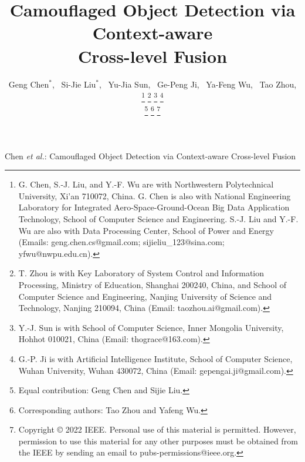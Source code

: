 \documentclass[lettersize,journal]{IEEEtran}
\begin{document}
\title{Camouflaged Object Detection via Context-aware\\ Cross-level Fusion}

\author{Geng Chen$^{*}$,~
	Si-Jie Liu$^{*}$,~
	Yu-Jia Sun,~
	Ge-Peng Ji,~
	Ya-Feng Wu,~
	Tao Zhou, 

\thanks{G. Chen, S.-J. Liu, and Y.-F. Wu are with Northwestern Polytechnical University, Xi'an 710072, China. G. Chen is also with National Engineering Laboratory for Integrated Aero-Space-Ground-Ocean Big Data Application Technology, School of Computer Science and Engineering. S.-J. Liu and Y.-F. Wu are also with Data Processing Center, School of Power and Energy (Emails: geng.chen.cs@gmail.com; sijieliu\_123@sina.com; yfwu@nwpu.edu.cn).}
\thanks{T. Zhou is with Key Laboratory of System Control and Information Processing, Ministry of Education, Shanghai 200240, China, and School of Computer Science and Engineering, Nanjing University of Science and Technology, Nanjing 210094, China (Email: taozhou.ai@gmail.com).}
\thanks{Y.-J. Sun is with School of Computer Science, Inner Mongolia University, Hohhot 010021, China (Email: thograce@163.com).}
\thanks{G.-P. Ji is with Artificial Intelligence Institute, School of Computer Science, Wuhan University, Wuhan 430072, China (Email: gepengai.ji@gmail.com).}

\thanks{Equal contribution: Geng Chen and Sijie Liu.}
\thanks{Corresponding authors: Tao Zhou and Yafeng Wu.}
\thanks{Copyright © 2022 IEEE. Personal use of this material is permitted.
However, permission to use this material for any other purposes must be obtained from the IEEE by sending an email to pubs-permissions@ieee.org.}}

%
{Chen  \MakeLowercase{\textit{et al.}}: Camouflaged Object Detection via Context-aware Cross-level Fusion}
\end{document}
